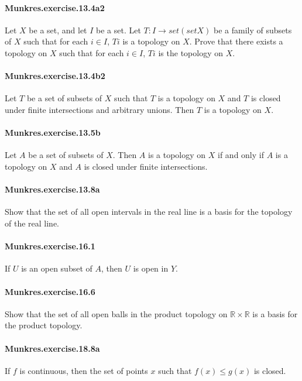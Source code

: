 \documentclass{article}
\begin{document}
\paragraph{Munkres.exercise.13.4a2} Let $X$ be a set, and let $I$ be a set. Let $T : I → set (set X)$ be a family of subsets of $X$ such that for each $i \in I$, $T i$ is a topology on $X$. Prove that there exists a topology on $X$ such that for each $i \in I$, $T i$ is the topology on $X$.

\paragraph{Munkres.exercise.13.4b2} Let $T$ be a set of subsets of $X$ such that $T$ is a topology on $X$ and $T$ is closed under finite intersections and arbitrary unions. Then $T$ is a topology on $X$.

\paragraph{Munkres.exercise.13.5b} Let $A$ be a set of subsets of $X$. Then $A$ is a topology on $X$ if and only if $A$ is a topology on $X$ and $A$ is closed under finite intersections.

\paragraph{Munkres.exercise.13.8a} Show that the set of all open intervals in the real line is a basis for the topology of the real line.

\paragraph{Munkres.exercise.16.1} If $U$ is an open subset of $A$, then $U$ is open in $Y$.

\paragraph{Munkres.exercise.16.6} Show that the set of all open balls in the product topology on $\mathbb{R} × \mathbb{R}$ is a basis for the product topology.

\paragraph{Munkres.exercise.18.8a} If $f$ is continuous, then the set of points $x$ such that $f(x) \leq g(x)$ is closed.
\end{document}
